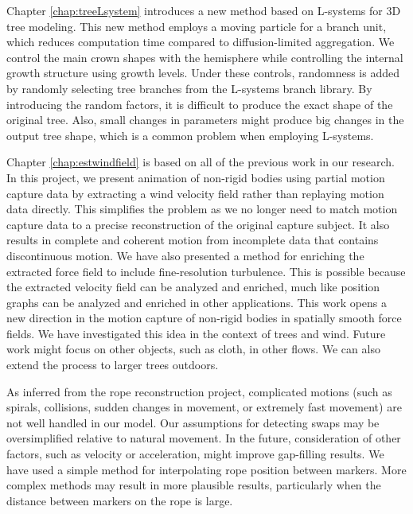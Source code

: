 Chapter \ref{chap:treeLsystem} introduces a new method based on L-systems for 3D tree modeling. This new method employs a moving particle for a branch unit, which reduces computation time compared to diffusion-limited aggregation. We control the main crown shapes with the hemisphere while controlling the internal growth structure using growth levels. Under these controls, randomness is added by randomly selecting tree branches from the L-systems branch library. By introducing the random factors, it is difficult to produce the exact shape of the original tree. Also, small changes in parameters might produce big changes in the output tree shape, which is a common problem when employing L-systems.

Chapter \ref{chap:estwindfield} is based on all of the previous work in our research. In this project, we present animation of non-rigid bodies using partial motion capture data by extracting a wind velocity field rather than replaying motion data directly. This simplifies the problem as we no longer need to match motion capture data to a precise reconstruction of the original capture subject. It also results in complete and coherent motion from incomplete data that contains discontinuous motion. We have also presented a method for enriching the extracted force field to include fine-resolution turbulence. This is possible because the extracted velocity field can be analyzed and enriched, much like position graphs can be analyzed and enriched in other applications. This work opens a new direction in the motion capture of non-rigid bodies in spatially smooth force fields. We have investigated this idea in the context of trees and wind. Future work might focus on other objects, such as cloth, in other flows. We can also extend the process to larger trees outdoors.

As inferred from the rope reconstruction project, complicated motions (such as spirals, collisions, sudden changes in movement, or extremely fast movement) are not well handled in our model. Our assumptions for detecting swaps may be oversimplified relative to natural movement. In the future, consideration of other factors, such as velocity or acceleration, might improve gap-filling results. We have used a simple method for interpolating rope position between markers.  More complex methods may result in more plausible results, particularly when the distance between markers on the rope is large.


